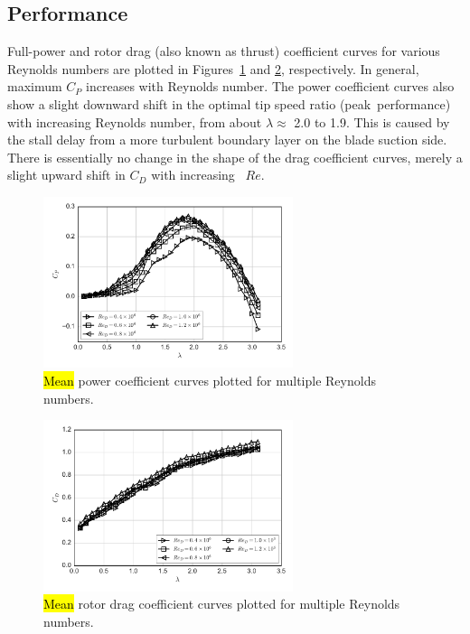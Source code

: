 \documentclass[energies,article,accept,moreauthors,pdftex,10pt,a4paper]{mdpi}
\theoremstyle{mdpi}
\newcounter{ex}
\newcounter{re}
\begin{document}
\subsection{Performance}

Full-power and rotor drag (also known as thrust) coefficient curves for various
Reynolds numbers are plotted in Figures~\ref{fig:cp-curves} and
\ref{fig:cd-curves}, respectively. In general, maximum $C_P$ increases
with Reynolds number. The power coefficient curves also show a slight downward
shift in the optimal tip speed ratio (peak~performance) with increasing Reynolds
number, from about $\lambda \approx$ 2.0 to 1.9. This is caused by the stall
delay from a more turbulent boundary layer on the blade suction side. There is
essentially no change in the shape of the drag coefficient curves, merely a
slight upward shift in $C_D$ with increasing~ $Re$.

\begin{figure}[H]
\centering

\includegraphics[width=0.65\textwidth]{figures/cp_curves}

\caption{\hl {Mean} power coefficient curves plotted for multiple Reynolds numbers.}
\label{fig:cp-curves}
\end{figure}
\unskip

\begin{figure}[H]
\centering

\includegraphics[width=0.65\textwidth]{figures/cd_curves}

\caption{\hl {Mean} rotor drag coefficient curves plotted for multiple Reynolds
 numbers.}

\label{fig:cd-curves}
\end{figure}
\end{document}
